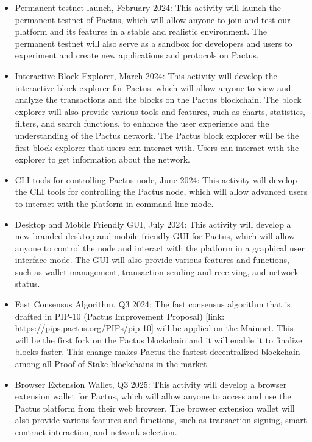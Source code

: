 \documentclass{novel}
\begin{document}
\begin{itemize}
  \item
        Permanent testnet launch, February 2024: This activity will launch the permanent testnet of Pactus, which will allow anyone to join and test our platform and its features in a stable and realistic environment. The permanent testnet will also serve as a sandbox for developers and users to experiment and create new applications and protocols on Pactus.
  \item
        Interactive Block Explorer, March 2024: This activity will develop the interactive block explorer for Pactus, which will allow anyone to view and analyze the transactions and the blocks on the Pactus blockchain. The block explorer will also provide various tools and features, such as charts, statistics, filters, and search functions, to enhance the user experience and the understanding of the Pactus network. The Pactus block explorer will be the first block explorer that users can interact with. Users can interact with the explorer to get information about the network.
  \item
        CLI tools for controlling Pactus node, June 2024: This activity will develop the CLI tools for controlling the Pactus node, which will allow advanced users to interact with the platform in command-line mode.
  \item
        Desktop and Mobile Friendly GUI, July 2024: This activity will develop a new branded desktop and mobile-friendly GUI for Pactus, which will allow anyone to control the node and interact with the platform in a graphical user interface mode. The GUI will also provide various features and functions, such as wallet management, transaction sending and receiving, and network status.
  \item
        Fast Consensus Algorithm, Q3 2024: The fast consensus algorithm that is drafted in PIP-10 (Pactus Improvement Proposal) [link: https://pips.pactus.org/PIPs/pip-10] will be applied on the Mainnet. This will be the first fork on the Pactus blockchain and it will enable it to finalize blocks faster. This change makes Pactus the fastest decentralized blockchain among all Proof of Stake blockchains in the market.
  \item
        Browser Extension Wallet, Q3 2025: This activity will develop a browser extension wallet for Pactus, which will allow anyone to access and use the Pactus platform from their web browser. The browser extension wallet will also provide various features and functions, such as transaction signing, smart contract interaction, and network selection.
\end{itemize}
\end{document}
